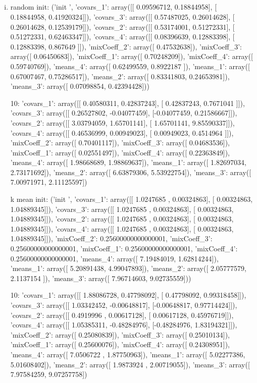 \documentclass[12pt,twoside]{article}
\begin{document}
\subsection{}
\begin{enumerate}[(ii)]
\item

random
init:
('init ', {'covars_1': array([[ 0.09596712,  0.18844958],
       [ 0.18844958,  0.41920324]]), 'covars_3': array([[ 0.57487025,  0.26014628],
       [ 0.26014628,  0.12539179]]), 'covars_2': array([[ 0.53174001,  0.51272331],
       [ 0.51272331,  0.62463347]]), 'covars_4': array([[ 0.08396639,  0.12883398],
       [ 0.12883398,  0.867649  ]]), 'mixCoeff_2': array([ 0.47532638]), 'mixCoeff_3': array([ 0.06450683]), 'mixCoeff_1': array([ 0.70248209]), 'mixCoeff_4': array([ 0.59740769]), 'means_4': array([ 0.62499559,  0.8922187 ]), 'means_1': array([ 0.67007467,  0.75286517]), 'means_2': array([ 0.83341803,  0.24653981]), 'means_3': array([ 0.07098854,  0.42394428])})
       
10:
{'covars_1': array([[ 0.40580311,  0.42837243],
       [ 0.42837243,  0.7671041 ]]), 'covars_3': array([[ 0.26527802, -0.04077459],
       [-0.04077459,  0.21586667]]), 'covars_2': array([[ 3.03794059,  1.65701141],
       [ 1.65701141,  9.85590337]]), 'covars_4': array([[ 0.46536999,  0.00949023],
       [ 0.00949023,  0.4514964 ]]), 'mixCoeff_2': array([ 0.70401117]), 'mixCoeff_3': array([ 0.04683536]), 'mixCoeff_1': array([ 0.02551497]), 'mixCoeff_4': array([ 0.22363849]), 'means_4': array([ 1.98668689,  1.98869637]), 'means_1': array([ 1.82697034,  2.73171692]), 'means_2': array([ 6.63879306,  5.53922754]), 'means_3': array([ 7.00971971,  2.11125597])}


k mean 
init:
('init ', {'covars_1': array([[ 1.0247685 ,  0.00324863],
       [ 0.00324863,  1.04889345]]), 'covars_3': array([[ 1.0247685 ,  0.00324863],
       [ 0.00324863,  1.04889345]]), 'covars_2': array([[ 1.0247685 ,  0.00324863],
       [ 0.00324863,  1.04889345]]), 'covars_4': array([[ 1.0247685 ,  0.00324863],
       [ 0.00324863,  1.04889345]]), 'mixCoeff_2': 0.25600000000000001, 'mixCoeff_3': 0.25600000000000001, 'mixCoeff_1': 0.25600000000000001, 'mixCoeff_4': 0.25600000000000001, 'means_4': array([ 7.19484019,  1.62814244]), 'means_1': array([ 5.20891438,  4.99047893]), 'means_2': array([ 2.05777579,  2.1137154 ]), 'means_3': array([ 7.96714603,  9.02735559])})



10:
{'covars_1': array([[ 1.88086728,  0.47798092],
       [ 0.47798092,  0.99318458]]), 'covars_3': array([[ 1.03342452, -0.00648817],
       [-0.00648817,  0.97714424]]), 'covars_2': array([[ 0.4919996 ,  0.00617128],
       [ 0.00617128,  0.45976719]]), 'covars_4': array([[ 1.05385311, -0.48284976],
       [-0.48284976,  1.83194321]]), 'mixCoeff_2': array([ 0.25080839]), 'mixCoeff_3': array([ 0.25010134]), 'mixCoeff_1': array([ 0.25600076]), 'mixCoeff_4': array([ 0.24308951]), 'means_4': array([ 7.0506722 ,  1.87750963]), 'means_1': array([ 5.02277386,  5.01608402]), 'means_2': array([ 1.9873924 ,  2.00719055]), 'means_3': array([ 7.97584259,  9.07257758])}
\end{enumerate}
\end{document}
